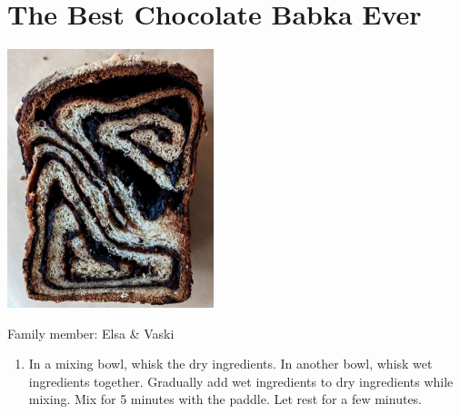 \chapter{The Best Chocolate Babka Ever}
\label{ch:babka}


\begin{marginfigure}[20pt]
  \includegraphics[width=60mm]{velsa/images/Babka.png}
\end{marginfigure}

Family member: Elsa \& Vaski

\begin{enumerate}
    \item In a mixing bowl, whisk the dry ingredients. In another bowl, whisk wet ingredients together. Gradually add wet ingredients to dry ingredients while mixing. Mix for 5 minutes with the paddle. Let rest for a few minutes.

\end{enumerate}

